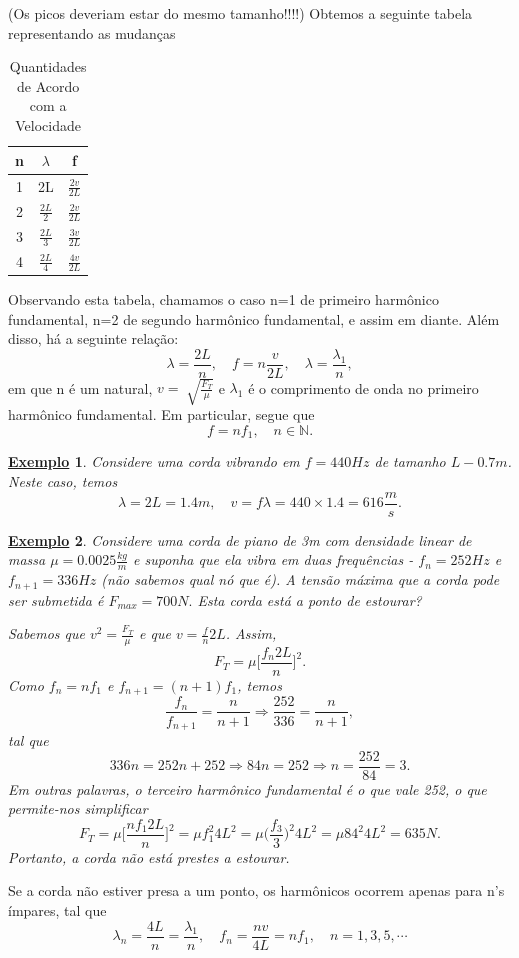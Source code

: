 \documentclass{article}
\newtheorem{example}{\underline{Exemplo}}
\begin{document}
(Os picos deveriam estar do mesmo tamanho!!!!)
Obtemos a seguinte tabela representando as mudanças
\begin{center}
  \begin{table}[h!]
    \caption{Quantidades de Acordo com a Velocidade}
    \centering
    \begin{tabular}{| c | c | c |}
      \hline
      n & \(\lambda \) & f \\
      \hline
      1 & 2L & \(\frac{2v}{2L}\)\\
      2 & \(\frac{2L}{2}\) & \(\frac{2v}{2L}\)\\
      3 & \(\frac{2L}{3}\) & \(\frac{3v}{2L}\)\\
      4 & \(\frac{2L}{4}\) & \(\frac{4v}{2L}\)\\
      \hline
    \end{tabular}
  \end{table}
\end{center}
Observando esta tabela, chamamos o caso n=1 de primeiro harmônico fundamental, n=2 de segundo harmônico fundamental, e assim em diante. Além disso, há a seguinte relação: 
\[
  \lambda = \frac{2L}{n},\quad f = n \frac{v}{2L},\quad \lambda = \frac{\lambda_{1}}{n},
\]
em que n é um natural, \(v = \sqrt[]{\frac{F_{T}}{\mu}}\) e \(\lambda_{1}\) é o comprimento de onda no primeiro harmônico fundamental. Em particular, segue que 
\[
  f = n f_{1},\quad n\in \mathbb{N}.
\]
\begin{example}
  Considere uma corda vibrando em \(f = 440Hz\) de tamanho \(L - 0.7m\). Neste caso, temos 
  \[
    \lambda  = 2L = 1.4m,\quad v = f\lambda = 440\times 1.4 = 616\frac{m}{s}.
  \]
\end{example}
\begin{example}
  Considere uma corda de piano de 3m com densidade linear de massa \(\mu = 0.0025 \frac{kg}{m}\) e suponha que ela vibra em duas frequências - \(f_{n} = 252Hz\) e \(f_{n+1} = 336Hz\)
  (não sabemos qual nó que é). A tensão máxima que a corda pode ser submetida é \(F_{max} = 700N.\) Esta corda está a ponto de estourar?

  Sabemos que \(v^{2} = \frac{F_{T}}{\mu}\) e que \(v = \frac{f}{n}2L\). Assim, 
  \[
    F_{T} = \mu \biggl[\frac{f_{n}2L}{n}\biggr]^{2}.
  \]
  Como \(f_{n} = nf_{1}\) e \(f_{n+1} = (n+1)f_{1}\), temos 
  \[
    \frac{f_{n}}{f_{n+1}} = \frac{n}{n+1} \Rightarrow \frac{252}{336} = \frac{n}{n+1},
  \]
  tal que 
  \[
    336n = 252n + 252 \Rightarrow 84n = 252 \Rightarrow n = \frac{252}{84} = 3.
  \]
  Em outras palavras, o terceiro harmônico fundamental é o que vale 252, o que permite-nos simplificar 
  \[
    F_{T} = \mu \biggl[\frac{nf_{1}2L}{n}\biggr]^{2} = \mu f_{1}^{2}4L^{2} = \mu \biggl(\frac{f_{3}}{3}\biggr)^{2}4L^{2} = \mu 84^{2}4L^{2} = 635N.
  \]
  Portanto, a corda não está prestes a estourar.
\end{example}
Se a corda não estiver presa a um ponto, os harmônicos ocorrem apenas para n's ímpares, tal que 
\[
  \lambda_{n} = \frac{4L}{n} = \frac{\lambda_{1}}{n},\quad f_{n} = \frac{nv}{4L} = nf_{1},\quad n = 1, 3, 5, \cdots
\]
\end{document}
